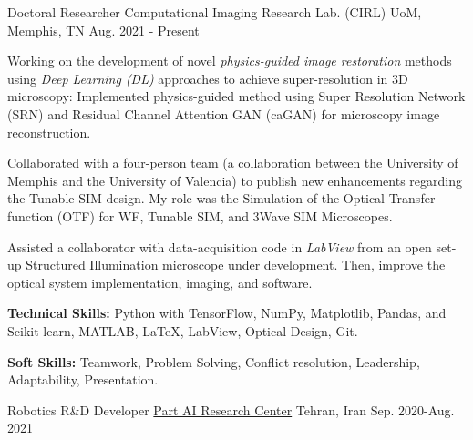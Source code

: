 

\begin{cventries}

  \cventry
    {Doctoral Researcher} %
    {Computational Imaging Research Lab. (CIRL)} %
    {UoM, Memphis, TN} %
    {Aug. 2021 -  Present} %
    {
      \begin{cvitems} %
                \item{Working on the development of novel \textit{physics-guided image restoration} methods using \textit{Deep Learning (DL)} approaches to achieve super-resolution in 3D microscopy: Implemented physics-guided method using Super Resolution Network (SRN) and Residual Channel Attention GAN (caGAN) for microscopy image reconstruction.}
              \item{Collaborated with a four-person team (a collaboration between the University of Memphis and the University of Valencia) to publish new enhancements regarding the Tunable SIM design. My role was the Simulation of the Optical Transfer function (OTF) for WF, Tunable SIM, and 3Wave SIM Microscopes.}
              \item{Assisted a collaborator with data-acquisition code in \textit{LabView} from an open set-up Structured Illumination microscope under development. Then, improve the optical system implementation, imaging, and software.}
          \item {\textbf{Technical Skills:} Python with TensorFlow, NumPy, Matplotlib, Pandas, and Scikit-learn, MATLAB, \LaTeX, LabView, Optical Design, Git.}
        \item {\textbf{Soft Skills:} Teamwork, Problem Solving, Conflict resolution, Leadership, Adaptability, Presentation.}
      \end{cvitems}
    }
  \cventry
    {Robotics R\&D Developer}  %
    {\href{https://ir.linkedin.com/company/partdp-ai}{Part AI Research Center}} %
    {Tehran, Iran} %
    {Sep. 2020-Aug. 2021} %

\end{cventries}
